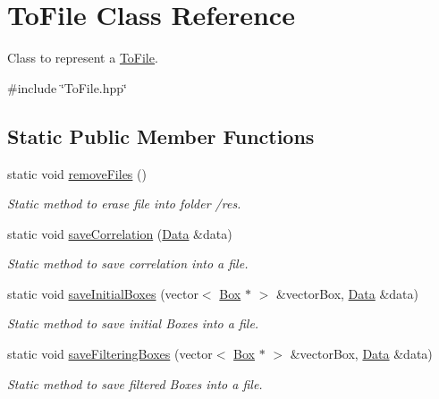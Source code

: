 \hypertarget{classToFile}{\section{\-To\-File \-Class \-Reference}
\label{classToFile}
}


\-Class to represent a {\ttfamily \hyperlink{classToFile}{\-To\-File}}.  




{\ttfamily \#include \char`\"{}\-To\-File.\-hpp\char`\"{}}

\subsection*{\-Static \-Public \-Member \-Functions}
\begin{DoxyCompactItemize}
\item 
static void \hyperlink{classToFile_a5b11e44ce14c723de9b294d55bb849f9}{remove\-Files} ()
\begin{DoxyCompactList}\small\item\em {\itshape \-Static\/} method to erase file into folder /res. \end{DoxyCompactList}\item 
static void \hyperlink{classToFile_a4f1ef2f804a0c7c14adcc916019bc6c4}{save\-Correlation} (\hyperlink{classData}{\-Data} \&data)
\begin{DoxyCompactList}\small\item\em {\itshape \-Static\/} method to save correlation into a file. \end{DoxyCompactList}\item 
static void \hyperlink{classToFile_a481fa3922718bb87c88fd9e1736eaa03}{save\-Initial\-Boxes} (vector$<$ \hyperlink{classBox}{\-Box} $\ast$ $>$ \&vector\-Box, \hyperlink{classData}{\-Data} \&data)
\begin{DoxyCompactList}\small\item\em {\itshape \-Static\/} method to save initial {\ttfamily \-Boxes} into a file. \end{DoxyCompactList}\item 
static void \hyperlink{classToFile_a2b6e091140c639f7c2586760342d67ef}{save\-Filtering\-Boxes} (vector$<$ \hyperlink{classBox}{\-Box} $\ast$ $>$ \&vector\-Box, \hyperlink{classData}{\-Data} \&data)
\begin{DoxyCompactList}\small\item\em {\itshape \-Static\/} method to save filtered {\ttfamily \-Boxes} into a file. \end{DoxyCompactList}\item 

\end{DoxyCompactItemize}
